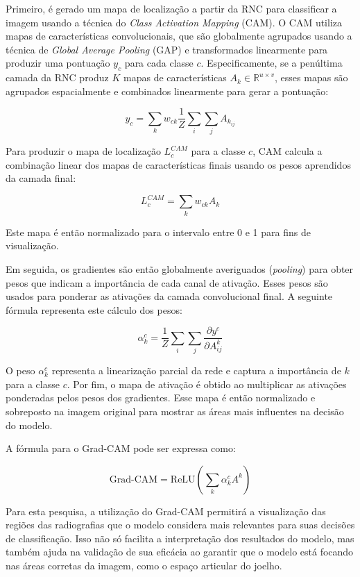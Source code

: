 Primeiro, é gerado um mapa de localização a partir da RNC para classificar a imagem usando a técnica do \textit{Class Activation Mapping} (CAM). O CAM utiliza mapas de características convolucionais, que são globalmente agrupados usando a técnica de \textit{Global Average Pooling} (GAP) e transformados linearmente para produzir uma pontuação \( y_c \) para cada classe \( c \). Especificamente, se a penúltima camada da RNC produz \( K \) mapas de características \( A_k \in \mathbb{R}^{u \times v} \), esses mapas são agrupados espacialmente e combinados linearmente para gerar a pontuação:

\[
y_c = \sum_k w_{ck} \frac{1}{Z} \sum_i \sum_j A_{k_{ij}}
\]

Para produzir o mapa de localização \( L_c^{CAM} \) para a classe \( c \), CAM calcula a combinação linear dos mapas de características finais usando os pesos aprendidos da camada final:

\[
L_c^{CAM} = \sum_k w_{ck} A_k
\]

Este mapa é então normalizado para o intervalo entre 0 e 1 para fins de visualização.

Em seguida, os gradientes são então globalmente averiguados (\textit{pooling}) para obter pesos que indicam a importância de cada canal de ativação. Esses pesos são usados para ponderar as ativações da camada convolucional final. A seguinte fórmula representa este cálculo dos pesos:

\[
\alpha_{k}^{c} = \frac{1}{Z} \sum_i \sum_j \frac{\partial y^{c}}{\partial A_{ij}^{k}}
\]

O peso \( \alpha_{k}^{c} \) representa a linearização parcial da rede e captura a importância de \(k \) para a classe \(c \). Por fim, o mapa de ativação é obtido ao multiplicar as ativações ponderadas pelos pesos dos gradientes. Esse mapa é então normalizado e sobreposto na imagem original para mostrar as áreas mais influentes na decisão do modelo.

A fórmula para o Grad-CAM pode ser expressa como:

\[
\text{Grad-CAM} = \text{ReLU} \left( \sum_{k} \alpha_{k}^{c} A^{k} \right)
\]

Para esta pesquisa, a utilização do Grad-CAM permitirá a visualização das regiões das radiografias que o modelo considera mais relevantes para suas decisões de classificação. Isso não só facilita a interpretação dos resultados do modelo, mas também ajuda na validação de sua eficácia ao garantir que o modelo está focando nas áreas corretas da imagem, como o espaço articular do joelho.